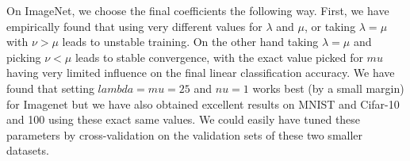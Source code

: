 On ImageNet, we choose the final coefficients the following way. First, we have empirically found that using very different values for $\lambda$ and $\mu$, or taking $\lambda=\mu$ with $\nu > \mu$ leads to unstable training. On the other hand taking $\lambda=\mu$ and picking $\nu<\mu$ leads to stable convergence, with the exact value picked for $mu$ having very limited influence on the final linear classification accuracy. We have found that setting $lambda=mu= 25$ and $nu=1$ works best (by a small margin) for Imagenet but we have also obtained excellent results on MNIST and Cifar-10 and 100 using these exact same values. We could easily have tuned these parameters by cross-validation on the validation sets of these two smaller datasets.

\def \hfillx {\hspace*{-\textwidth} \hfill}
